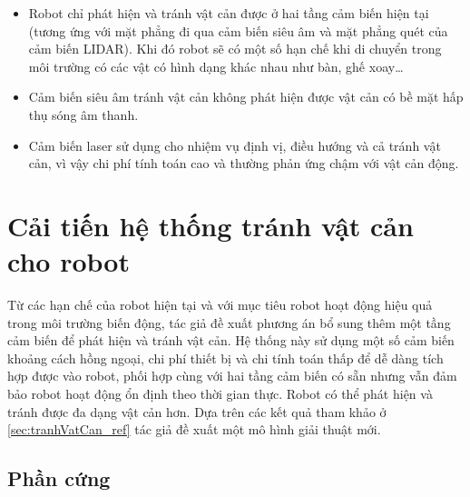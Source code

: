 \begin{itemize}
    \item Robot chỉ phát hiện và tránh vật cản được ở hai tầng cảm biến hiện tại (tương ứng với mặt phẳng đi qua cảm biến siêu âm và mặt phẳng quét của cảm biến LIDAR). Khi đó robot sẽ có một số hạn chế khi di chuyển trong môi trường có các vật có hình dạng khác nhau như bàn, ghế xoay\dots
    \item Cảm biến siêu âm tránh vật cản không phát hiện được vật cản có bề mặt hấp thụ sóng âm thanh.
    \item Cảm biến laser sử dụng cho nhiệm vụ định vị, điều hướng và cả tránh vật cản, vì vậy chi phí tính toán cao và thường phản ứng chậm với vật cản động.
\end{itemize}


\section{Cải tiến hệ thống tránh vật cản cho robot}
\label{sec:caitienhethongtranhvatcan}


Từ các hạn chế của robot hiện tại và với mục tiêu robot hoạt động hiệu quả trong môi trường biến động, tác giả đề xuất phương án bổ sung thêm một tầng cảm biến để phát hiện và tránh vật cản. Hệ thống này sử dụng một số cảm biến khoảng cách hồng ngoại, chi phí thiết bị và chi tính toán thấp để dễ dàng tích hợp được vào robot, phối hợp cùng với hai tầng cảm biến có sẵn nhưng vẫn đảm bảo robot hoạt động ổn định theo thời gian thực. Robot có thể phát hiện và tránh được đa dạng vật cản hơn. Dựa trên các kết quả tham khảo ở \ref{sec:tranhVatCan_ref} tác giả đề xuất một mô hình giải thuật mới.

\subsection{Phần cứng}


